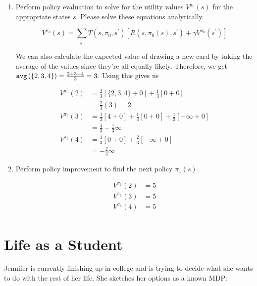 \documentclass[12pt]{article}
\begin{document}
\begin{enumerate}
\begin{enumerate}
 \item Perform policy evaluation to solve for the utility values
  $V^{\pi_0}(s)$ for the appropriate states $s$.  Please solve these
  equations analytically.

  \[
    V^{\pi_{0}}(s) = \sum_{s^{\prime}}T(s, \pi_{0}, s^{\prime})\left[ R(s, \pi_{0}(s), s^{\prime}) + \gamma V^{\pi_{0}}(s^{\prime}) \right]
  \]

We can also calculate the expected value of drawing a new card by taking the average of the values since they're all equally likely. Therefore, we get $\text{{\tt avg}}\left( \{2, 3, 4\}\right) = \frac{2 + 3 + 4}{3} = 3$. Using this gives us

\begin{align*}
  V^{\pi_{0}}(2) &= \frac{2}{3}\left[ \{2, 3, 4\} + 0\right] + \frac{1}{3}\left[ 0 + 0\right]\\
               &= \frac{2}{3}(3) = 2\\
  V^{\pi_{0}}(3) &= \frac{1}{3}\left[ 4 + 0 \right] + \frac{1}{3}\left[ 0 + 0\right] + \frac{1}{3}\left[ -\infty + 0\right]\\
               &= \frac{4}{3} - \frac{1}{3}\infty\\
  V^{\pi_{0}}(4) &= \frac{1}{3}\left[ 0 + 0\right] + \frac{2}{3}\left[ -\infty + 0\right]\\
               &= -\frac{2}{3}\infty
\end{align*}

  \item Perform policy improvement to find the next policy $\pi_1(s)$.

\begin{align*}
  V^{\pi_{1}}(2) &= 5\\
  V^{\pi_{1}}(3) &= 5\\
  V^{\pi_{1}}(4) &= 5\\
\end{align*}

  \end{enumerate}

\end{enumerate}

\clearpage

\section{Life as a Student}

Jennifer is currently finishing up in college and is trying to decide
what she wants to do with the rest of her life.  She sketches her
options as a known MDP:
\end{document}
